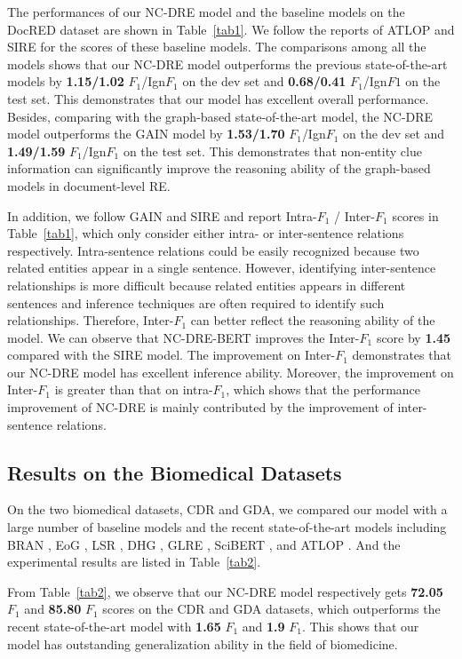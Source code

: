 \documentclass[sigconf,natbib=true]{acmart}
\begin{document}
The performances of our NC-DRE model and the baseline models on the DocRED dataset are shown in Table~\ref{tab1}. We follow the reports of ATLOP \cite{c:106} and SIRE \cite{c:121} for the scores of these baseline models. The comparisons among all the models shows that our NC-DRE model outperforms the previous state-of-the-art models by \textbf{1.15/1.02} $F_1$/Ign$F_1$ on the dev set and \textbf{0.68/0.41} $F_1$/Ign$F1$ on the test set. 
This demonstrates that our model has excellent overall performance.
Besides, comparing with the graph-based state-of-the-art model, the NC-DRE model outperforms the GAIN model by \textbf{1.53/1.70} $F_1$/Ign$F_1$ on the dev set and \textbf{1.49/1.59} $F_1$/Ign$F_1$ on the test set. 
This demonstrates that non-entity clue information can significantly improve the reasoning ability of the graph-based models in document-level RE.

In addition, we follow GAIN \cite{c:118} and SIRE\cite{c:121} and report Intra-$F_1$ / Inter-$F_1$ scores in Table~\ref{tab1}, which only consider either intra- or inter-sentence relations respectively. 
Intra-sentence relations could be easily recognized because two related entities appear in a single sentence. 
However, identifying inter-sentence relationships is more difficult because related entities appears in different sentences and inference techniques are often required to identify such relationships.
Therefore, Inter-$F_1$ can better reflect the reasoning ability of the model.
We can observe that NC-DRE-BERT improves the Inter-$F_1$ score by \textbf{1.45} compared with the SIRE model.
The improvement on Inter-$F_1$ demonstrates that our NC-DRE model has excellent inference ability.
Moreover, the improvement on Inter-$F_1$ is greater than that on intra-$F_1$, which shows that the performance improvement of NC-DRE is mainly contributed by the improvement of inter-sentence relations.


\subsection{Results on the Biomedical Datasets}
On the two biomedical datasets, CDR and GDA, we compared our model with a large number of baseline models and the recent state-of-the-art models including BRAN \cite{c:136}, EoG \cite{c:108}, LSR \cite{c:130}, DHG \cite{c:138}, GLRE \cite{c:131}, SciBERT \cite{c:126}, and ATLOP \cite{c:106}.  %
And the experimental results are listed in Table~\ref{tab2}.

From Table~\ref{tab2}, we observe that our NC-DRE model respectively gets \textbf{72.05} $F_1$ and \textbf{85.80} $F_1$ scores on the CDR and GDA datasets, which outperforms the recent state-of-the-art model with \textbf{1.65} $F_1$ and \textbf{1.9} $F_1$.
This shows that our model has outstanding generalization ability in the field of biomedicine.
\end{document}
